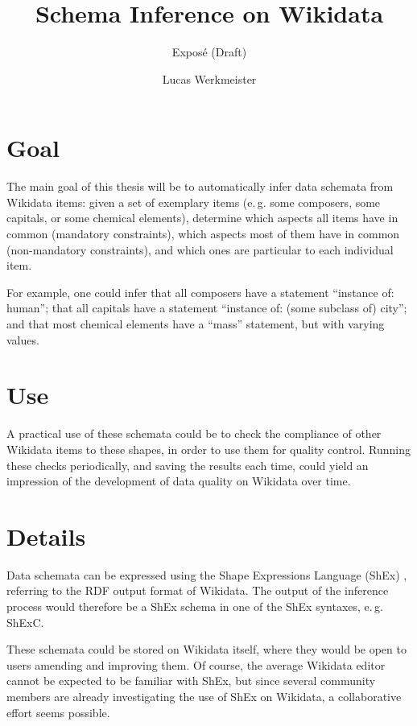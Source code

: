 \documentclass{scrartcl}
\title{Schema Inference on Wikidata}
\subtitle{Exposé (Draft)}
\author{Lucas Werkmeister}
\begin{document}
\maketitle

\section{Goal}

The main goal of this thesis will be to automatically infer data schemata from Wikidata items:
given a set of exemplary items (e.\,g. some composers, some capitals, or some chemical elements),
determine which aspects all items have in common (mandatory constraints),
which aspects most of them have in common (non-mandatory constraints),
and which ones are particular to each individual item.

For example, one could infer that all composers have a statement “instance of: human”;
that all capitals have a statement “instance of: (some subclass of) city”;
and that most chemical elements have a “mass” statement, but with varying values.

\section{Use}

A practical use of these schemata could be to check the compliance of other Wikidata items to these shapes,
in order to use them for quality control.
Running these checks periodically, and saving the results each time,
could yield an impression of the development of data quality on Wikidata over time.

\section{Details}

Data schemata can be expressed using the Shape Expressions Language (ShEx) \cite{Prud'hommeaux:2014:SER:2660517.2660523},
referring to the RDF output format of Wikidata.
The output of the inference process would therefore be a ShEx schema in one of the ShEx syntaxes, e.\,g. ShExC.

These schemata could be stored on Wikidata itself,
where they would be open to users amending and improving them.
Of course, the average Wikidata editor cannot be expected to be familiar with ShEx,
but since several community members are already investigating the use of ShEx on Wikidata,
a collaborative effort seems possible.
\end{document}
